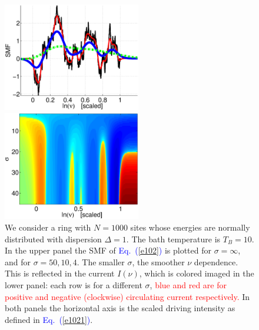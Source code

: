 \documentclass[aps,prl,floats,floatfix,twocolumn]{revtex4}
\newcommand{\Eq}[1]{\textcolor{blue}{Eq.\!\!~(\ref{#1})}}
\newcommand{\rmrk}[1]{\textcolor{red}{#1}}
\begin{document}
\begin{figure}
\includegraphics[width=6cm]{SMF_RW.eps}

\vspace*{5mm}

\includegraphics[width=6cm]{I_sig_tau.eps}

\caption{
We consider a ring with ${N=1000}$ sites whose energies 
are normally distributed with dispersion ${\Delta=1}$.
The bath temperature is $T_B=10$. In the upper panel 
the SMF of \Eq{e102} is plotted for $\sigma=\infty$, 
and for $\sigma=50,10,4$. The smaller $\sigma$, 
the smoother $\nu$ dependence. 
This is reflected in the current $I(\nu)$, which is colored 
imaged in the lower panel: each row is for a different $\sigma$,  
\rmrk{blue and red are for positive and negative (clockwise) 
circulating current respectively.}     
In both panels the horizontal axis is 
the scaled driving intensity as defined in \Eq{e1021}.} 
\label{f2}
\end{figure}
\end{document}
